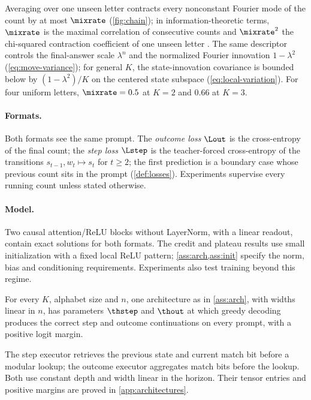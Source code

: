 Averaging over one unseen letter contracts every nonconstant Fourier mode of the count by at most $\mixrate$ (\cref{fig:chain}); in information-theoretic terms,
$\mixrate$ is the maximal correlation of consecutive counts and $\mixrate^2$ the chi-squared contraction coefficient of one
unseen letter \citep{witsenhausen1975sequences,raginsky2016strong}.
The same descriptor controls the final-answer scale $\lambda^n$ and the
normalized Fourier innovation $1-\lambda^2$ (\cref{eq:move-variance}); for general
$K$, the state-innovation covariance is bounded below by
$(1-\lambda^2)/K$ on the centered state subspace (\cref{eq:local-variation}).
For four uniform letters,
$\mixrate=0.5$ at $K=2$ and $0.66$ at $K=3$.

\paragraph{Formats.} Both formats see the same prompt. The \emph{outcome loss} $\Lout$ is the cross-entropy of the final
count; the \emph{step loss} $\Lstep$ is the teacher-forced cross-entropy of the transitions $s_{t-1},w_t\mapsto s_t$ for
$t\ge2$; the first prediction is a boundary case whose previous count sits in the prompt (\cref{def:losses}). Experiments
supervise every running count unless stated otherwise.

\paragraph{Model.} Two causal attention/ReLU blocks without LayerNorm, with a linear readout,
contain exact solutions for both formats. The credit and plateau results use small initialization
with a fixed local ReLU pattern; \cref{ass:arch,ass:init} specify the norm, bias and conditioning
requirements. Experiments also test training beyond this regime.

\begin{proposition}
\label{prop:represent}
For every $K$, alphabet size and $n$, one architecture as in \cref{ass:arch}, with widths linear in $n$, has parameters
$\thstep$ and $\thout$ at which greedy decoding produces the correct step and outcome continuations on every prompt, with
a positive logit margin.
\end{proposition}

The step executor retrieves the previous state and current match bit before a modular lookup;
the outcome executor aggregates match bits before the lookup. Both use constant depth and width
linear in the horizon. Their tensor entries and positive margins are proved in \cref{app:architectures}.

